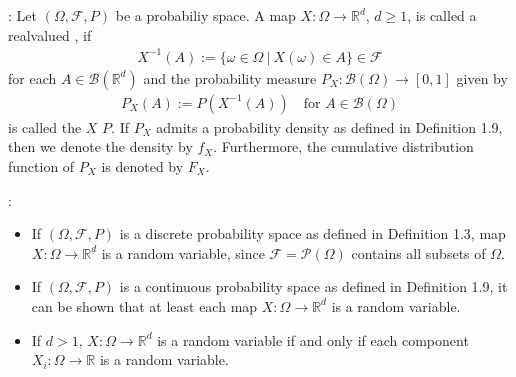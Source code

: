 \documentclass[letterpaper,10pt,english]{jupyterBook}
\begin{document}
\sphinxAtStartPar
{}: Let \((\Omega, \mathcal{F}, P)\) be a probabiliy space. A map \(X: \Omega \rightarrow \mathbb{R}^d\), \(d \ge 1\), is called a real\sphinxhyphen{}valued , if
\begin{equation*}
\begin{split} X^{-1}(A) := \{ \omega \in \Omega~|~X(\omega) \in A \} \in \mathcal{F}\end{split}
\end{equation*}
\sphinxAtStartPar
for each \(A \in \mathcal{B}(\mathbb{R}^d)\) and the probability measure \(P_X: \mathcal{B}(\Omega) \rightarrow [0, 1]\) given by
\begin{equation*}
\begin{split}P_X(A) := P(X^{-1}(A)) \quad \text{for } A \in \mathcal{B}(\Omega)\end{split}
\end{equation*}
\sphinxAtStartPar
is called the  \(X\)  \(P\). If \(P_X\) admits a probability density as defined in Definition 1.9, then we denote the density by \(f_X\). Furthermore, the cumulative distribution function of \(P_X\) is denoted by \(F_X\).

\sphinxAtStartPar
{}:
\begin{itemize}
\item {} 
\sphinxAtStartPar
If \((\Omega, \mathcal{F}, P)\) is a discrete probability space as defined in Definition 1.3,  map \(X: \Omega \rightarrow \mathbb{R}^d\) is a random variable, since \(\mathcal{F} = \mathcal{P}(\Omega)\) contains all subsets of \(\Omega\).

\item {} 
\sphinxAtStartPar
If \((\Omega, \mathcal{F}, P)\) is a continuous probability space as defined in Definition 1.9, it can be shown that at least each  map \(X: \Omega \rightarrow \mathbb{R}^d\) is a random variable.

\item {} 
\sphinxAtStartPar
If \(d > 1\), \(X: \Omega \rightarrow \mathbb{R}^d\) is a random variable if and only if each component \(X_i: \Omega \rightarrow \mathbb{R}\) is a random variable.

\end{itemize}
\end{document}
